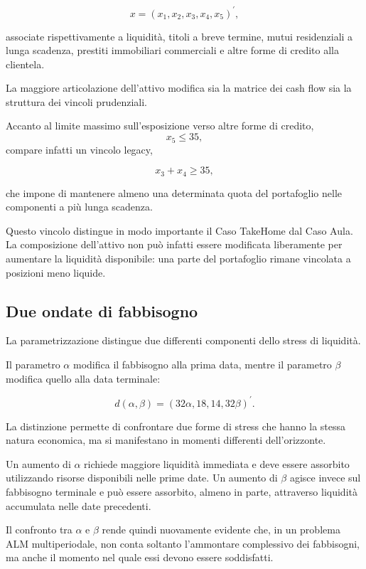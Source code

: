 $$
x=
(x_1,x_2,x_3,x_4,x_5)^{\prime},
$$

\noindent associate rispettivamente a liquidit\`a, titoli a breve termine, mutui
residenziali a lunga scadenza, prestiti immobiliari commerciali e altre forme
di credito alla clientela.

La maggiore articolazione dell'attivo modifica sia la matrice dei cash flow
sia la struttura dei vincoli prudenziali.

Accanto al limite massimo sull'esposizione verso altre forme di credito,
\[
x_5 \le 35,
\]
compare infatti un vincolo legacy,

$$
x_3+x_4\geq 35,
$$

\noindent che impone di mantenere almeno una determinata quota del portafoglio nelle
componenti a pi\`u lunga scadenza.

Questo vincolo distingue in modo importante il Caso TakeHome dal Caso Aula.
La composizione dell'attivo non pu\`o infatti essere modificata liberamente
per aumentare la liquidit\`a disponibile: una parte del portafoglio rimane
vincolata a posizioni meno liquide.

\subsection{Due ondate di fabbisogno}

La parametrizzazione distingue due differenti componenti dello stress di
liquidit\`a.

Il parametro $\alpha$ modifica il fabbisogno alla prima data, mentre il
parametro $\beta$ modifica quello alla data terminale:

$$
d(\alpha,\beta)
=
\left(
32\alpha,
18,
14,
32\beta
\right)^{\prime}.
$$

La distinzione permette di confrontare due forme di stress che hanno la stessa
natura economica, ma si manifestano in momenti differenti dell'orizzonte.

Un aumento di $\alpha$ richiede maggiore liquidit\`a immediata e deve essere
assorbito utilizzando risorse disponibili nelle prime date. Un aumento di
$\beta$ agisce invece sul fabbisogno terminale e pu\`o essere assorbito, almeno
in parte, attraverso liquidit\`a accumulata nelle date precedenti.

Il confronto tra $\alpha$ e $\beta$ rende quindi nuovamente evidente che, in
un problema ALM multiperiodale, non conta soltanto l'ammontare complessivo
dei fabbisogni, ma anche il momento nel quale essi devono essere soddisfatti.

